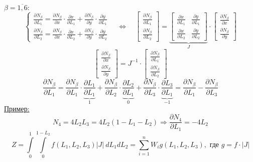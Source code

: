 \documentclass{bmstu}
\begin{document}
	$\beta=\overline{1, 6}:$
	\[
	\begin{cases}
		\frac{\partial N_{\beta}}{\partial L_1} = \frac{\partial N_{\beta}}{\partial x} \cdot \frac{\partial x}{\partial L_1} + \frac{\partial N_{\beta}}{\partial y} \cdot \frac{\partial y}{\partial L_1} \\
		\frac{\partial N_{\beta}}{\partial L_2} = \frac{\partial N_{\beta}}{\partial x} \cdot \frac{\partial x}{\partial L_2} + \frac{\partial N_{\beta}}{\partial y} \cdot \frac{\partial y}{\partial L_2}
	\end{cases} \quad \Leftrightarrow \quad \begin{bmatrix}
	\frac{\partial N_{\beta}}{\partial L_1} \\ \frac{\partial N_{\beta}}{\partial L_2}
	\end{bmatrix} = \underbrace{\begin{bmatrix}
	\frac{\partial x}{\partial L_1} & \frac{\partial y}{\partial L_1} \\ \frac{\partial x}{\partial L_2} & \frac{\partial y}{\partial L_2} 
	\end{bmatrix}}_J \cdot \begin{bmatrix}
 	\frac{\partial N_{\beta}}{\partial x} \\ \frac{\partial N_{\beta}}{\partial y}
	\end{bmatrix}
	\]
	\[
	\begin{bmatrix}
		\frac{\partial N_{\beta}}{\partial x} \\ \frac{\partial N_{\beta}}{\partial y}
	\end{bmatrix} = J^{-1} \cdot \begin{bmatrix}
	\frac{\partial N_{\beta}}{\partial L_1} \\ \frac{\partial N_{\beta}}{\partial L_2}
	\end{bmatrix}
	\]
	\[
	\frac{\partial N_{\beta}}{\partial L_1}= \frac{\partial N_{\beta}}{\partial L_1}\cdot \underbrace{\frac{\partial L_1}{\partial L_1}}_1 + \frac{\partial N_{\beta}}{\partial L_2}\cdot \underbrace{\frac{\partial L_2}{\partial L_1}}_0+\frac{\partial N_{\beta}}{\partial L_3}\cdot \underbrace{\frac{\partial L_3}{\partial L_1}}_{-1}=\frac{\partial N_{\beta}}{\partial L_1}-\frac{\partial N_{\beta}}{\partial L_3}
	\]
	\underline{Пример:}
	\[
	N_4=4L_2L_3=4L_2(1-L_1-L_2)\Rightarrow \frac{\partial N_4}{\partial L_1}=-4L_2
	\]
	\[
	Z=\int\limits_0^1\int\limits_0^{1-L_2} f(L_1, L_2, L_3)|J|\ dL_1dL_2 = \sum\limits_{i=1}^{n} W_i g (L_1,L_2,L_3), \text{ где } g=f\cdot|J|
	\]
\end{document}
